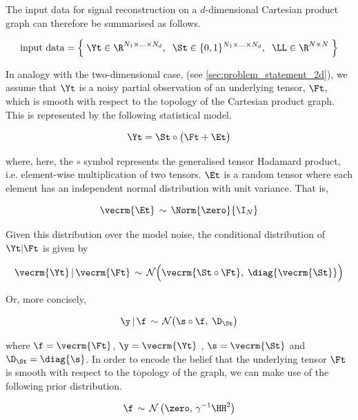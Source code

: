 The input data for signal reconstruction on a $d$-dimensional Cartesian product graph can therefore be summarised as follows. 

\begin{equation*}
    \text{input data} = \Big\{\; \Yt \in \R^{N_1 \times ... \times N_d}, \;\; \St \in \{0, 1\}^{N_1 \times ... \times N_d} , \;\; \LL \in \R^{N \times N} \; \Big\}
\end{equation*}

In analogy with the two-dimensional case, (see \cref{sec:problem_statement_2d}), we assume that $\Yt$ is a noisy partial observation of an underlying tensor, $\Ft$, which is smooth with respect to the topology of the Cartesian product graph. This is represented by the following statistical model. 

\begin{equation}
    \Yt = \St \circ \big(\Ft + \Et \big)
\end{equation}

where, here, the $\circ$ symbol represents the generalised tensor Hadamard product, i.e. element-wise multiplication of two tensors. $\Et$ is a random tensor where each element has an independent normal distribution with unit variance. That is,

\begin{equation}
    \vecrm{\Et} \, \sim \, \Norm{\zero}{\I_N}
\end{equation}

Given this distribution over the model noise, the conditional distribution of $\Yt |  \Ft$ is given by 

\begin{equation}
    \vecrm{\Yt} \, | \, \vecrm{\Ft} \, \sim \, \mathcal{N}\Big(\vecrm{\St \circ \Ft}, \; \diag{\vecrm{\St}}\Big)
\end{equation}

Or, more concisely, 

\begin{equation}
    \y \, | \, \f \, \sim \, \mathcal{N}\big(\s \circ \f, \; \D_{\St} \big)
\end{equation}

where $\f = \vecrm{\Ft}$, $\y = \vecrm{\Yt}$ , $\s = \vecrm{\St}$ and $\D_{\St} = \diag{\s}$. In order to encode the belief that the underlying tensor $\Ft$ is smooth with respect to the topology of the graph, we can make use of the following prior distribution. 

\begin{equation}
    \f \, \sim \, \mathcal{N}\left( \zero, \, \gamma^{-1} \HH^2 \right) 
\end{equation}

